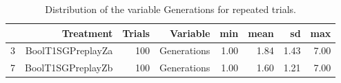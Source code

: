 \begin{table}[ht]
\centering
\begin{tabular}{rrrrrrrr}
  \hline
 & Treatment & Trials & Variable & min & mean & sd & max \\ 
  \hline
3 & BoolT1SGPreplayZa & 100 & Generations & 1.00 & 1.84 & 1.43 & 7.00 \\ 
  7 & BoolT1SGPreplayZb & 100 & Generations & 1.00 & 1.60 & 1.21 & 7.00 \\ 
   \hline
\end{tabular}
\caption{Distribution of the variable Generations for repeated trials.} 
\end{table}
